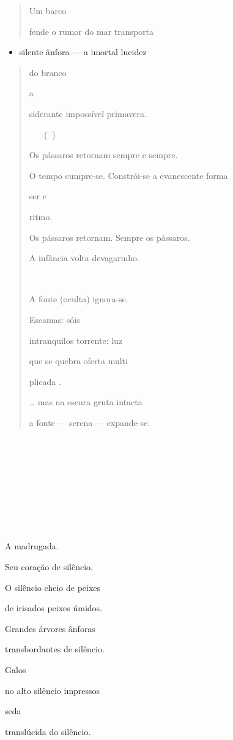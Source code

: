 \begin{quote}
Um barco

fende o rumor do mar transporta
\end{quote}

\begin{itemize}
\item
  silente ânfora --- a imortal lucidez
\end{itemize}

\begin{quote}
do branco

a

siderante impossível primavera.

 ()

Os pássaros retornam sempre e sempre.

O tempo cumpre-se. Constrói-se a evanescente forma

ser e

ritmo.

Os pássaros retornam. Sempre os pássaros.

A infância volta devagarinho.



A fonte (oculta) ignora-se.

Escamas: sóis

intranquilos torrente: luz

que se quebra oferta multi

plicada .

\ldots{} mas na escura gruta intacta

a fonte --- serena --- expande-se.
\end{quote}











A madrugada.

Seu coração de silêncio.

O silêncio cheio de peixes

de irisados peixes úmidos.

Grandes árvores ânforas

transbordantes de silêncio.

Galos

no alto silêncio impressos

seda

translúcida do silêncio.

